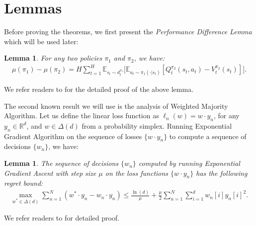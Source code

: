 \documentclass{article}
\newtheorem{lemma}[theorem]{Lemma}
\begin{document}
\section{Lemmas}
Before proving the theorems, we first present the \emph{Performance Difference Lemma} \cite{kakade2002approximately,ross2014reinforcement} which will be used later:
\begin{lemma}
\label{lemma:performance_difference}
For any two policies $\pi_1$ and $\pi_2$, we have:
\begin{align}
\mu(\pi_1) - \mu(\pi_2) = H\sum_{t=1}^H \mathbb{E}_{s_t\sim d_t^{\pi_1}}\big[\mathbb{E}_{a_t\sim \pi_1(\cdot|s_t)}[Q_t^{\pi_2}(s_t,a_t) - V_t^{\pi_2}(s_t)]\big].
\end{align}
\end{lemma} We refer readers to \cite{ross2014reinforcement} for the detailed proof of the above lemma. 

The second known result we will use is the analysis of Weighted Majority Algorithm. Let us define the linear loss function as $\ell_n(w) = w\cdot y_n$, for any $y_n\in\mathbb{R}^d$, and $w\in\Delta(d)$ from a probability simplex. Running Exponential Gradient Algorithm on the sequence of losses $\{w\cdot y_n\}$ to compute a sequence of decisions $\{w_n\}$, we have:
\begin{lemma} 
\label{lemma:EG}
The sequence of decisions $\{w_n\}$ computed by running Exponential Gradient Ascent with step size $\mu$ on the loss functions $\{w\cdot y_n\}$ has the following regret bound:
\begin{align}
\max_{w^*\in\Delta(d)} \sum_{n=1}^N (w^*\cdot y_n - w_n\cdot y_n) \leq \frac{\ln(d)}{\mu} + \frac{\mu}{2}\sum_{n=1}^N\sum_{i=1}^d w_n[i] y_n[i]^2.
\end{align}
\end{lemma} We refer readers to \cite{shalev2012online} for detailed proof.
\end{document}
